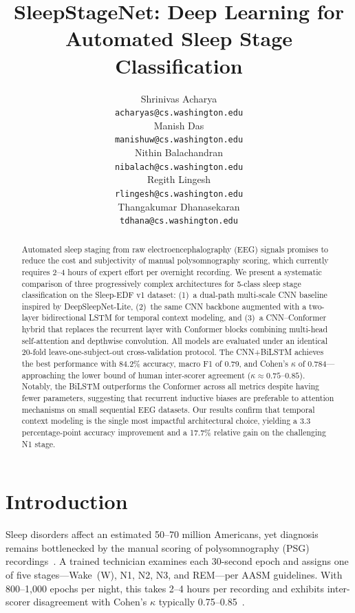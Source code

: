 \documentclass[final]{article}
\title{SleepStageNet: Deep Learning for Automated Sleep Stage Classification}
\author{%
  Shrinivas Acharya \\
  \texttt{acharyas@cs.washington.edu} \\
  \And
  Manish Das \\
  \texttt{manishuw@cs.washington.edu} \\
  \AND
  Nithin Balachandran \\
  \texttt{nibalach@cs.washington.edu} \\
  \And
  Regith Lingesh \\
  \texttt{rlingesh@cs.washington.edu} \\
  \And
  Thangakumar Dhanasekaran \\
  \texttt{tdhana@cs.washington.edu} \\
}
\begin{document}
\maketitle

\begin{abstract}
Automated sleep staging from raw electroencephalography (EEG) signals promises to reduce the cost and subjectivity of manual polysomnography scoring, which currently requires 2--4 hours of expert effort per overnight recording. We present a systematic comparison of three progressively complex architectures for 5-class sleep stage classification on the Sleep-EDF v1 dataset: (1)~a dual-path multi-scale CNN baseline inspired by DeepSleepNet-Lite, (2)~the same CNN backbone augmented with a two-layer bidirectional LSTM for temporal context modeling, and (3)~a CNN--Conformer hybrid that replaces the recurrent layer with Conformer blocks combining multi-head self-attention and depthwise convolution. All models are evaluated under an identical 20-fold leave-one-subject-out cross-validation protocol. The CNN+BiLSTM achieves the best performance with 84.2\% accuracy, macro F1 of 0.79, and Cohen's $\kappa$ of 0.784---approaching the lower bound of human inter-scorer agreement ($\kappa \approx 0.75$--$0.85$). Notably, the BiLSTM outperforms the Conformer across all metrics despite having fewer parameters, suggesting that recurrent inductive biases are preferable to attention mechanisms on small sequential EEG datasets. Our results confirm that temporal context modeling is the single most impactful architectural choice, yielding a 3.3 percentage-point accuracy improvement and a 17.7\% relative gain on the challenging N1 stage.
\end{abstract}

\section{Introduction}

Sleep disorders affect an estimated 50--70 million Americans, yet diagnosis remains bottlenecked by the manual scoring of polysomnography (PSG) recordings~\cite{Berry2012}. A trained technician examines each 30-second epoch and assigns one of five stages---Wake~(W), N1, N2, N3, and REM---per AASM guidelines. With 800--1,000 epochs per night, this takes 2--4 hours per recording and exhibits inter-scorer disagreement with Cohen's $\kappa$ typically 0.75--0.85~\cite{Rosenberg2013}.
\end{document}
